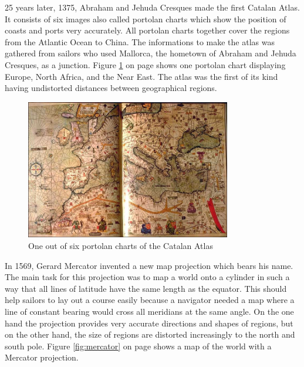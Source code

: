 25 years later, 1375, Abraham and Jehuda Cresques made the first Catalan Atlas. It consists of six images also called portolan charts which show the position of coasts and ports very accurately. All portolan charts together cover the regions from the Atlantic Ocean to China. The informations to make the atlas was gathered from sailors who used Mallorca, the hometown of Abraham and Jehuda Cresques, as a junction. Figure \ref{fig:catalan-atlas} on page \pageref{fig:catalan-atlas} shows one portolan chart displaying Europe, North Africa, and the Near East. The atlas was the first of its kind having undistorted distances between geographical regions.

\begin{figure}[!htb]
\centering
\includegraphics[width=0.8\textwidth,keepaspectratio]{images/history/catalan-atlas.jpg}
\caption[
    One out of six portolan charts of the Catalan Atlas, Urldate: 07.2016 \newline
\small\texttt{\url{http://datavis.ca/milestones//admin/uploads/images/CatalanE.jpg}}
]{One out of six portolan charts of the Catalan Atlas}
\label{fig:catalan-atlas}
\end{figure}

In 1569, Gerard Mercator invented a new map projection which bears his name. The main task for this projection was to map a world onto a cylinder in such a way that all lines of latitude have the same length as the equator. This should help sailors to lay out a course easily because a navigator needed a map where a line of constant bearing would cross all meridians at the same angle. On the one hand the projection provides very accurate directions and shapes of regions, but on the other hand, the size of regions are distorted increasingly to the north and south pole. Figure \ref{fig:mercator} on page \pageref{fig:mercator} shows a map of the world with a Mercator projection.

